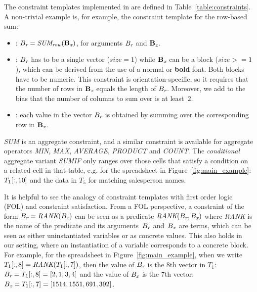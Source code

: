 \begin{example}
The constraint templates implemented in \sname are defined in Table~\ref{table:constraints}.
A non-trivial example is, for example, the constraint template for the row-based sum:

\begin{itemize}
  \item \CName: $B_{\textit{r}} = \textit{SUM\textsubscript{row}}(\mathbf{B_{\textit{x}}})$, for arguments $B_{\textit{r}}$ and $\mathbf{B_{\textit{x}}}$.
  
  \item \CSignature: $B_{\textit{r}}$ has to be a single vector ($\textit{size}=1$) while $\mathbf{B_{\textit{x}}}$ can be a block ($\textit{size}>=1$), which can be derived from the use of a normal or \textbf{bold} font.
  Both blocks have to be numeric.
  This constraint is orientation-specific, so it requires that the number of rows in $\mathbf{B_{\textit{x}}}$ equals the length of $B_{\textit{r}}$.
  Moreover, we add to the bias that the number of columns to sum over is at least~$2$.
  
  \item \CFunction: each value in the vector $B_{\textit{r}}$ is obtained by summing over the corresponding row in $\mathbf{B_{\textit{x}}}$.
\end{itemize}
\textit{SUM} is an aggregate constraint, and a similar constraint is available for aggregate operators \textit{MIN}, \textit{MAX}, \textit{AVERAGE}, \textit{PRODUCT} and \textit{COUNT}. The \textit{conditional} aggregate variant \textit{SUMIF} only ranges over those cells that satisfy a condition on a related cell in that table, e.g. for the spreadsheet in Figure~\ref{fig:main_example}: $T_1[:,10]$ and the data in $T_5$ for matching salesperson names.
\end{example}


It is helpful to see the analogy of constraint templates with first order logic (FOL) and constraint satisfaction.
From a FOL perspective, a constraint of the form $B_{\textit{r}} = \textit{RANK}(B_{\textit{x}})$ can be seen as a predicate $\textit{RANK}(B_{\textit{r}}, B_{\textit{x}})$ where \textit{RANK} is the name of the predicate and its arguments~$B_{\textit{r}}$ and~$B_{\textit{x}}$ are terms, which can be seen as either uninstantiated variables or as concrete values.
This also holds in our setting, where an instantiation of a variable corresponds to a concrete block.
For example, for the spreadsheet in Figure~\ref{fig:main_example}, when we write $T_1[:,8] = \textit{RANK}(T_1[:,7])$, then the value of $B_{\textit{r}}$ is the $8$th vector in $T_1$: $B_{\textit{r}} = T_1[:,8] = [2,1,3,4]$ and the value of $B_{\textit{x}}$ is the $7$th vector: $B_{\textit{x}} = T_1[:,7] = [1514, 1551, 691, 392]$.

